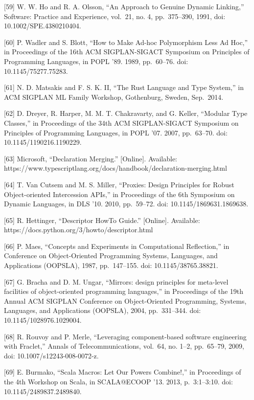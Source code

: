 \documentclass[
  10
]{article}
\begin{document}
{[}59{]} W. W. Ho and R. A. Olsson, ``An Approach to Genuine Dynamic Linking,''
Software: Practice and Experience, vol.~21, no. 4, pp.~375--390, 1991, doi:
10.1002/SPE.4380210404.

{[}60{]} P. Wadler and S. Blott, ``How to Make Ad-hoc Polymorphism Less Ad Hoc,'' in
Proceedings of the 16th ACM SIGPLAN-SIGACT Symposium on Principles of Programming
Languages, in POPL '89. 1989, pp.~60--76. doi: 10.1145/75277.75283.

{[}61{]} N. D. Matsakis and F. S. K. II, ``The Rust Language and Type System,'' in
ACM SIGPLAN ML Family Workshop, Gothenburg, Sweden, Sep.~2014.

{[}62{]} D. Dreyer, R. Harper, M. M. T. Chakravarty, and G. Keller, ``Modular Type
Classes,'' in Proceedings of the 34th ACM SIGPLAN-SIGACT Symposium on Principles of
Programming Languages, in POPL '07. 2007, pp.~63--70. doi: 10.1145/1190216.1190229.

{[}63{]} Microsoft, ``Declaration Merging.'' {[}Online{]}. Available:
https://www.typescriptlang.org/docs/handbook/declaration-merging.html

{[}64{]} T. Van Cutsem and M. S. Miller, ``Proxies: Design Principles for Robust
Object-oriented Intercession APIs,'' in Proceedings of the 6th Symposium on Dynamic
Languages, in DLS '10. 2010, pp.~59--72. doi: 10.1145/1869631.1869638.

{[}65{]} R. Hettinger, ``Descriptor HowTo Guide.'' {[}Online{]}. Available:
https://docs.python.org/3/howto/descriptor.html

{[}66{]} P. Maes, ``Concepts and Experiments in Computational Reflection,'' in
Conference on Object-Oriented Programming Systems, Languages, and Applications
(OOPSLA), 1987, pp.~147--155. doi: 10.1145/38765.38821.

{[}67{]} G. Bracha and D. M. Ungar, ``Mirrors: design principles for meta-level
facilities of object-oriented programming languages,'' in Proceedings of the 19th
Annual ACM SIGPLAN Conference on Object-Oriented Programming, Systems, Languages,
and Applications (OOPSLA), 2004, pp.~331--344. doi: 10.1145/1028976.1029004.

{[}68{]} R. Rouvoy and P. Merle, ``Leveraging component-based software engineering
with Fraclet,'' Annals of Telecommunications, vol.~64, no. 1--2, pp.~65--79, 2009,
doi: 10.1007/s12243-008-0072-z.

{[}69{]} E. Burmako, ``Scala Macros: Let Our Powers Combine!,'' in Proceedings of
the 4th Workshop on Scala, in SCALA@ECOOP '13. 2013, p.~3:1--3:10. doi:
10.1145/2489837.2489840.
\end{document}
